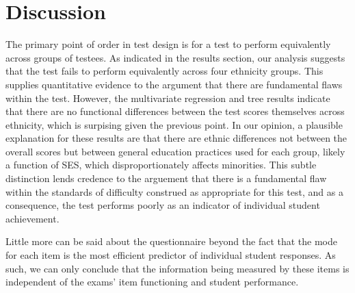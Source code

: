 \documentclass{article}\usepackage[]{graphicx}\usepackage[]{color}
\begin{document}
\section{Discussion}

The primary point of order in test design is for a test to perform equivalently across groups of testees. As indicated in the results section, our analysis suggests that the test fails to perform equivalently across four ethnicity groups. This supplies quantitative evidence to the argument that there are fundamental flaws within the test. However, the multivariate regression and tree results indicate that there are no functional differences between the test scores themselves across ethnicity, which is surpising given the previous point. In our opinion, a plausible explanation for these results are that there are ethnic differences not between the overall scores but between general education practices used for each group, likely a function of SES, which disproportionately affects minorities. This subtle distinction lends credence to the arguement that there is a fundamental flaw within the standards of difficulty construed as appropriate for this test, and as a consequence, the test performs poorly as an indicator of individual student achievement.

Little more can be said about the questionnaire beyond the fact that the mode for each item is the most efficient predictor of individual student responses. As such, we can only conclude that the information being measured by these items is independent of the exams' item functioning and student performance.


{}

\end{document}

